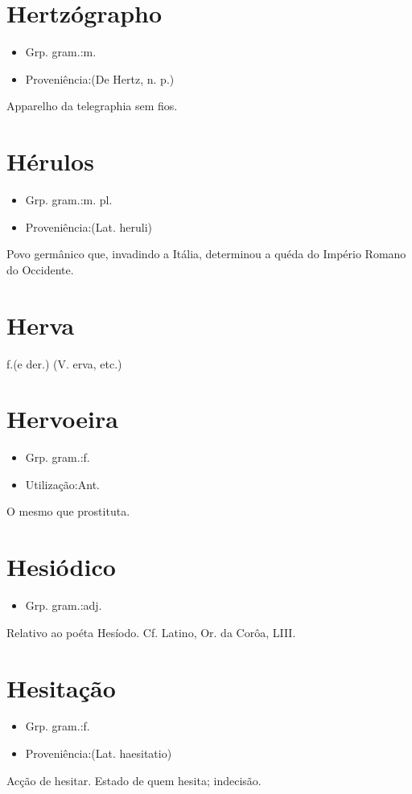 \documentclass{article}
\begin{document}
\section{Hertzógrapho}
\begin{itemize}
\item {Grp. gram.:m.}
\end{itemize}
\begin{itemize}
\item {Proveniência:(De \textunderscore Hertz\textunderscore , n. p.)}
\end{itemize}
Apparelho da telegraphia sem fios.
\section{Hérulos}
\begin{itemize}
\item {Grp. gram.:m. pl.}
\end{itemize}
\begin{itemize}
\item {Proveniência:(Lat. \textunderscore heruli\textunderscore )}
\end{itemize}
Povo germânico que, invadindo a Itália, determinou a quéda do Império Romano do Occidente.
\section{Herva}
\textunderscore f.\textunderscore  (e der.)
(V. \textunderscore erva\textunderscore , etc.)
\section{Hervoeira}
\begin{itemize}
\item {Grp. gram.:f.}
\end{itemize}
\begin{itemize}
\item {Utilização:Ant.}
\end{itemize}
O mesmo que \textunderscore prostituta\textunderscore .
\section{Hesiódico}
\begin{itemize}
\item {Grp. gram.:adj.}
\end{itemize}
Relativo ao poéta Hesíodo. Cf. Latino, \textunderscore Or. da Corôa\textunderscore , LIII.
\section{Hesitação}
\begin{itemize}
\item {Grp. gram.:f.}
\end{itemize}
\begin{itemize}
\item {Proveniência:(Lat. \textunderscore haesitatio\textunderscore )}
\end{itemize}
Acção de hesitar.
Estado de quem hesita; indecisão.
\end{document}

